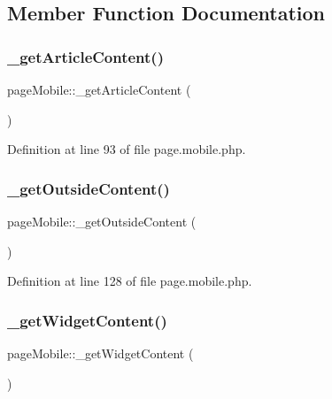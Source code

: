 \subsection{Member Function Documentation}
\mbox{\label{classpageMobile_a1db84b18401fa8f49a453908b65e3cb0}} 
\subsubsection{\texorpdfstring{\+\_\+get\+Article\+Content()}{\_getArticleContent()}}
{\footnotesize\ttfamily page\+Mobile\+::\+\_\+get\+Article\+Content (\begin{DoxyParamCaption}{ }\end{DoxyParamCaption})}



Definition at line 93 of file page.\+mobile.\+php.

\mbox{\label{classpageMobile_ac66b4cd03a329d1d64823f623d8e6fd2}} 
\subsubsection{\texorpdfstring{\+\_\+get\+Outside\+Content()}{\_getOutsideContent()}}
{\footnotesize\ttfamily page\+Mobile\+::\+\_\+get\+Outside\+Content (\begin{DoxyParamCaption}{ }\end{DoxyParamCaption})}



Definition at line 128 of file page.\+mobile.\+php.

\mbox{\label{classpageMobile_a5e65e98a19965434e96d015d758a6e04}} 
\subsubsection{\texorpdfstring{\+\_\+get\+Widget\+Content()}{\_getWidgetContent()}}
{\footnotesize\ttfamily page\+Mobile\+::\+\_\+get\+Widget\+Content (\begin{DoxyParamCaption}{ }\end{DoxyParamCaption})}



